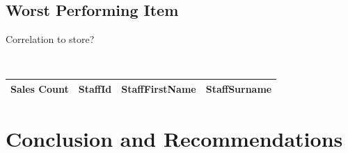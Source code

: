 \documentclass{article}
\begin{document}
            \subsection{Worst Performing Item}
                Correlation to store?

                \begin{lstlisting}
                    
                \end{lstlisting}

                \begin{table}[H]
                    \centering
                    \begin{tabular}{|l|l|l|l|}
                    \hline
                    Sales Count & StaffId & StaffFirstName & StaffSurname \\ \hline
                    \end{tabular}
                    \end{table}




	\newpage
    \section{Conclusion and Recommendations}
\end{document}
